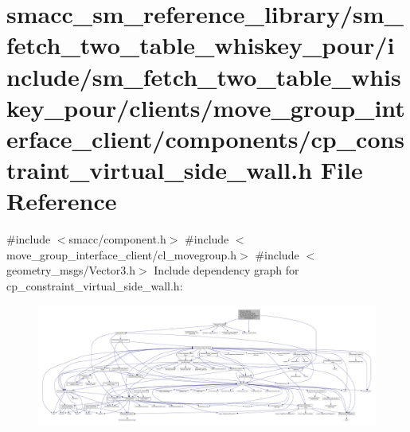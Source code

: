\hypertarget{sm__fetch__two__table__whiskey__pour_2include_2sm__fetch__two__table__whiskey__pour_2clients_2mo9cd1e6a6ae4038c653862869c4e5aa60}{}\section{smacc\+\_\+sm\+\_\+reference\+\_\+library/sm\+\_\+fetch\+\_\+two\+\_\+table\+\_\+whiskey\+\_\+pour/include/sm\+\_\+fetch\+\_\+two\+\_\+table\+\_\+whiskey\+\_\+pour/clients/move\+\_\+group\+\_\+interface\+\_\+client/components/cp\+\_\+constraint\+\_\+virtual\+\_\+side\+\_\+wall.h File Reference}
\label{sm__fetch__two__table__whiskey__pour_2include_2sm__fetch__two__table__whiskey__pour_2clients_2mo9cd1e6a6ae4038c653862869c4e5aa60}
{\ttfamily \#include $<$smacc/component.\+h$>$}\newline
{\ttfamily \#include $<$move\+\_\+group\+\_\+interface\+\_\+client/cl\+\_\+movegroup.\+h$>$}\newline
{\ttfamily \#include $<$geometry\+\_\+msgs/\+Vector3.\+h$>$}\newline
Include dependency graph for cp\+\_\+constraint\+\_\+virtual\+\_\+side\+\_\+wall.\+h\+:
\nopagebreak
\begin{figure}[H]
\begin{center}
\leavevmode
\includegraphics[width=350pt]{sm__fetch__two__table__whiskey__pour_2include_2sm__fetch__two__table__whiskey__pour_2clients_2mobebc394ee69fd3414a77a190c25cccc6}
\end{center}
\end{figure}
